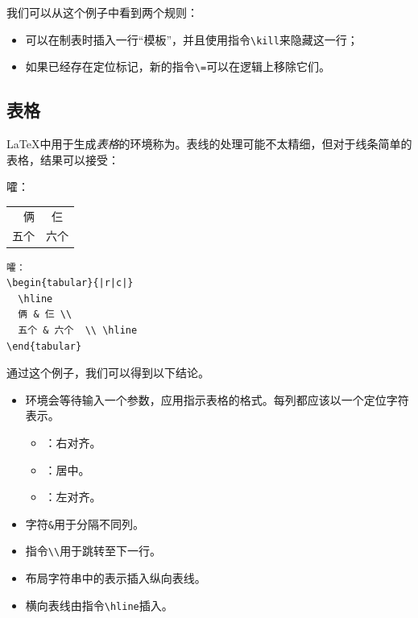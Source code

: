 我们可以从这个例子中看到两个规则：

\begin{itemize}
    \item 可以在制表时插入一行“模板”，并且使用指令\verb|\kill|来隐藏这一行；
    \item 如果已经存在定位标记，新的指令\verb|\=|可以在逻辑上移除它们。
\end{itemize}

\subsection{表格}

\LaTeX 中用于生成\emph{表格}的环境称为。表线的处理可能不太精细，但对于线条简单的表格，结果可以接受：

\begin{codelist}[2.11]{
    嚯：
    \begin{tabular}{|r|c|}
        \hline
        俩 & 仨 \\
        五个 & 六个  \\ \hline
      \end{tabular}
}
\begin{verbatim}
嚯：
\begin{tabular}{|r|c|}
  \hline
  俩 & 仨 \\
  五个 & 六个  \\ \hline
\end{tabular}\end{verbatim}
\end{codelist}

通过这个例子，我们可以得到以下结论。

\begin{itemize}
    \item 环境会等待输入一个参数，应用指示表格的格式。每列都应该以一个定位字符表示。
    \begin{itemize}
        \item {}：右对齐。
        \item {}：居中。
        \item {}：左对齐。
    \end{itemize}
    \item 字符\verb|&|用于分隔不同列。
    \item 指令\verb|\\|用于跳转至下一行。
    \item 布局字符串中的\dm{|}表示插入纵向表线。
    \item 横向表线由指令\verb|\hline|插入。
\end{itemize}

